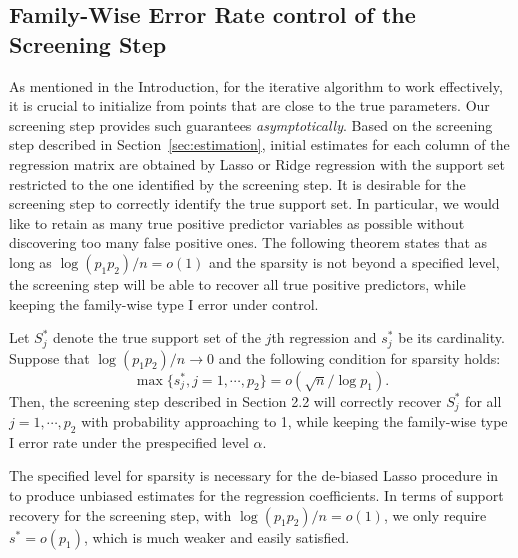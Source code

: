 %
%

\subsection{\normalsize Family-Wise Error Rate  control of the Screening Step}\label{sec:FWER}

As mentioned in the Introduction, for the iterative algorithm to work effectively, it is crucial to initialize from points that are close to the true parameters. Our screening step provides such guarantees {\em asymptotically}. Based on the screening step described in Section~\ref{sec:estimation}, initial estimates for each column of the regression matrix are obtained by Lasso or Ridge regression with the support set restricted to the one identified by the screening step. It is desirable for the screening step to correctly identify the true support set. In particular, we would like to retain as many true positive predictor variables as possible without discovering too many false positive ones. The following theorem states that as long as $\log(p_1p_2)/n = o(1)$ and the sparsity is not beyond a specified level, the screening step will be able to recover all true positive predictors, while keeping the family-wise type I error under control. 

\begin{theorem}\label{thm:FWER}
Let $S^*_j$ denote the true support set of the $j$th regression and $s^*_j$ be its cardinality. Suppose that $\log(p_1p_2)/n\rightarrow 0$ and the following condition for sparsity holds:
\begin{equation*}
\max\{s^*_j,j=1,\cdots,p_2\} = o(\sqrt{n}/\log p_1).
\end{equation*}
Then, the screening step described in Section 2.2 will correctly recover $S^*_j$ for all $j=1,\cdots,p_2$ with probability approaching to 1, while keeping the family-wise type I error rate under the prespecified level $\alpha$. 
\end{theorem}



\begin{remark}
The specified level for sparsity is necessary for the de-biased Lasso procedure in \citet{javanmard2014confidence} to produce unbiased estimates for the regression coefficients. In terms of support recovery for the screening step, with $\log(p_1p_2)/n = o(1)$, we only require $s^*=o(p_1)$, which is much weaker and easily satisfied. 
\end{remark}

